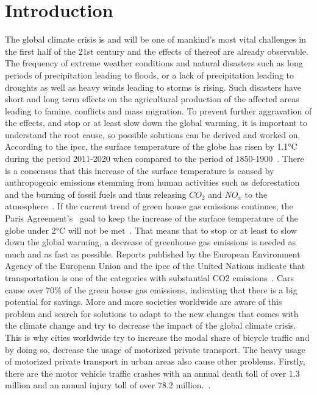 \cleardoublepage
\chapter{Introduction}
\label{cha:introduction}
The global climate crisis is and will be one of mankind's most vital challenges in the first half of the 21st century and the effects of thereof are already observable.
The frequency of extreme weather conditions and natural disasters such as long periods of precipitation leading to floods, or a lack of precipitation leading to droughts as well as heavy winds leading to storms is rising.
Such disasters have short and long term effects on the agricultural production of the affected areas leading to famine, conflicts and mass migration.
To prevent further aggravation of the effects, and stop or at least slow down the global warming, it is important to understand the root cause, so possible solutions can be derived and worked on. 
According to the \ac{ipcc}, the surface temperature of the globe has risen by 1.1°C during the period 2011-2020 when compared to the period of 1850-1900~\cite{lee2023climate}.
There is a consensus that this increase of the surface temperature is caused by anthropogenic emissions stemming from human activities such as deforestation and the burning of fossil fuels and thus releasing $CO_{2}$ and $NO_{x}$ to the atmosphere~\cite{archer2010climate}.
If the current trend of green house gas emissions continues, the Paris Agreement's~\cite{un2015paris} goal to keep the increase of the surface temperature of the globe under 2°C will not be met~\cite{noah2023data}.
That means that to stop or at least to slow down the global warming, a decrease of greenhouse gas emissions is needed as much and as fast as possible.
Reports published by the European Environment Agency of the European Union and the \ac{ipcc} of the United Nations indicate that transportation is one of the categories with substantial CO2 emissions~\cite{lee2023climate2}.
Cars cause over 70\% of the green house gas emissions, indicating that there is a big potential for savings.
More and more societies worldwide are aware of this problem and search for solutions to adapt to the new changes that comes with the climate change and try to decrease the impact of the global climate crisis.
This is why cities worldwide try to increase the modal share of bicycle traffic and by doing so, decrease the usage of motorized private transport.
The heavy usage of motorized private transport in urban areas also cause other problems.
Firstly, there are the motor vehicle traffic crashes with an annual death toll of over 1.3 million and an annual injury toll of over 78.2 million.~\cite{bhalla2014transport}.
